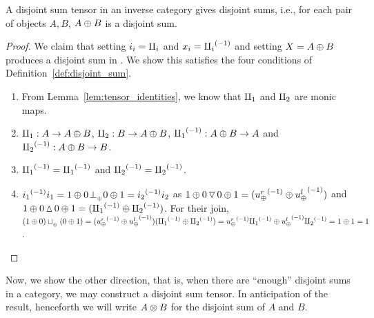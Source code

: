 
\begin{proposition}\label{prop:a_disjoint_sum_tensor_gives_disjoint_sums}
  A disjoint sum tensor in an inverse category \X gives disjoint sums, i.e., for each pair of
  objects $A,B$, $A\oplus B$ is a disjoint sum.
\end{proposition}
\begin{proof}
  We claim that setting $i_i = \amalg_{i}$ and $x_i = {\amalg_{i}}^{(-1)}$ and setting $X = A\oplus B$ produces a disjoint
  sum in \X. We show this satisfies the four conditions of Definition~\ref{def:disjoint_sum}.
  \begin{enumerate}[{(}i{)}]
    \item From Lemma~\ref{lem:tensor_identities}, we know that $\amalg_{1}$ and $\amalg_{2}$ are monic maps.
    \item $\amalg_{1} : A \to A\oplus B$, $\amalg_{2}: B \to A\oplus B$, ${\amalg_{1}}^{(-1)}: A\oplus B \to A$ and ${\amalg_{2}}^{(-1)}: A\oplus B \to B$.
    \item ${\amalg_{1}}^{(-1)} = {\amalg_{1}}^{(-1)}$ and ${\amalg_{2}}^{(-1)} = {\amalg_{2}}^{(-1)}$.
    \item ${i_1}^{(-1)}i_1 = 1\oplus 0 {}_{{}_{}}{\perp_{{}_{\oplus}}} 0\oplus1 = {i_2}^{(-1)}i_2$ as
      $1\oplus0 \operatorname{\triangledown} 0\oplus1 = ({u_{\oplus}^r}^{(-1)}\oplus{\ensuremath{u_{\oplus}^l}}^{(-1)})$ and
      $1\oplus0 \operatorname{\vartriangle} 0\oplus1 = ({\amalg_{1}}^{(-1)}\oplus{\amalg_{2}}^{(-1)})$. For their join,
      $(1\oplus0)\sqcup_{{_{\oplus}}} (0\oplus1) = ({u_{\oplus}^r}^{(-1)}\oplus{\ensuremath{u_{\oplus}^l}}^{(-1)})({\amalg_{1}}^{(-1)}\oplus{\amalg_{2}}^{(-1)}) =
      {u_{\oplus}^r}^{(-1)}{\amalg_{1}}^{(-1)} \oplus {\ensuremath{u_{\oplus}^l}}^{(-1)}{\amalg_{2}}^{(-1)} = 1\oplus1 = 1$.
  \end{enumerate}
\end{proof}

Now, we show the other direction, that is, when there are ``enough'' disjoint sums in a category, we
may construct a disjoint sum tensor. In anticipation of the result, henceforth we will write $A\otimes B$
for the disjoint sum of $A$ and $B$.

